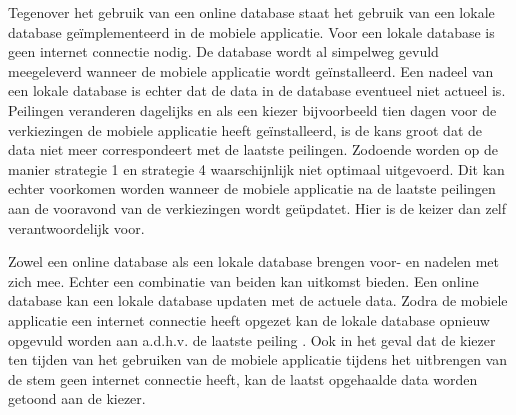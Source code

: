 Tegenover het gebruik van een online database staat het gebruik van een lokale database ge\"{i}mplementeerd in de mobiele applicatie. Voor een lokale database is geen internet connectie nodig. De database wordt al simpelweg gevuld meegeleverd wanneer de mobiele applicatie wordt ge\"{i}nstalleerd. Een nadeel van een lokale database is echter dat de data in de database eventueel niet actueel is. Peilingen veranderen dagelijks en als een kiezer bijvoorbeeld tien dagen voor de verkiezingen de mobiele applicatie heeft ge\"{i}nstalleerd, is de kans groot dat de data niet meer correspondeert met de laatste peilingen. Zodoende worden op de manier strategie 1 en strategie 4 waarschijnlijk niet optimaal uitgevoerd. Dit kan echter voorkomen worden wanneer de mobiele applicatie na de laatste peilingen aan de vooravond van de verkiezingen wordt ge\"{u}pdatet. Hier is de keizer dan zelf verantwoordelijk voor.

Zowel een online database als een lokale database brengen voor- en nadelen met zich mee. Echter een combinatie van beiden kan uitkomst bieden. Een online database kan een lokale database updaten met de actuele data. Zodra de mobiele applicatie een internet connectie heeft opgezet kan de lokale database opnieuw opgevuld worden aan a.d.h.v. de laatste peiling \citep{silberschatz1997database}. Ook in het geval dat de kiezer ten tijden van het gebruiken van de mobiele applicatie tijdens het uitbrengen van de stem geen internet connectie heeft, kan de laatst opgehaalde data worden getoond aan de kiezer. 





